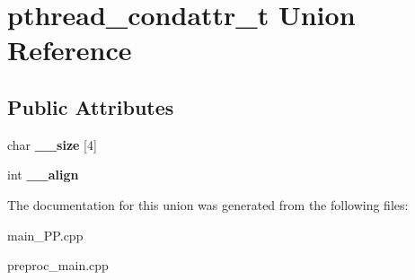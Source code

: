\hypertarget{unionpthread__condattr__t}{\section{pthread\+\_\+condattr\+\_\+t Union Reference}
\label{unionpthread__condattr__t}
}
\subsection*{Public Attributes}
\begin{DoxyCompactItemize}
\item 
\hypertarget{unionpthread__condattr__t_a626d5a3798c803e48512ef619cca713b}{char {\bfseries \+\_\+\+\_\+size} \mbox{[}4\mbox{]}}\label{unionpthread__condattr__t_a626d5a3798c803e48512ef619cca713b}

\item 
\hypertarget{unionpthread__condattr__t_ab8450ff960dfe7de672a9564b3cb0642}{int {\bfseries \+\_\+\+\_\+align}}\label{unionpthread__condattr__t_ab8450ff960dfe7de672a9564b3cb0642}

\end{DoxyCompactItemize}


The documentation for this union was generated from the following files\+:\begin{DoxyCompactItemize}
\item 
main\+\_\+\+P\+P.\+cpp\item 
preproc\+\_\+main.\+cpp\end{DoxyCompactItemize}

